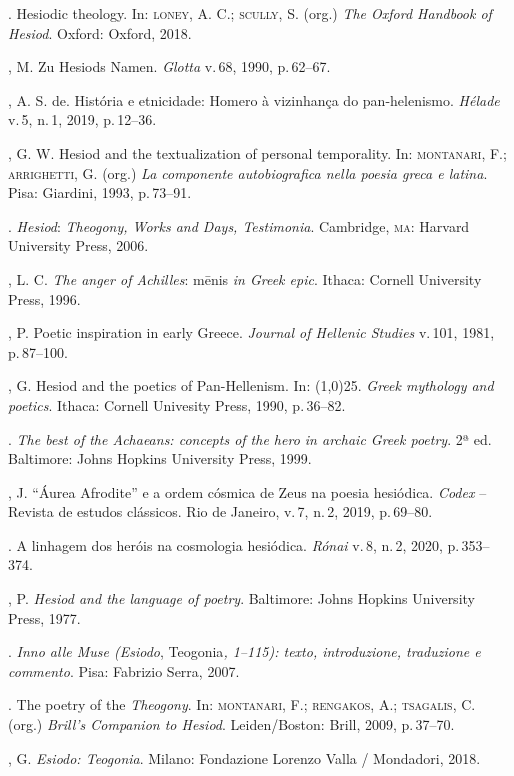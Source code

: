\begin{bibliohedra}
\titidem. Hesiodic theology. In: \textsc{loney}, A. C.; \textsc{scully}, S. (org.) \textit{The
Oxford Handbook of Hesiod}. Oxford: Oxford, 2018.

, M. Zu Hesiods Namen. \textit{Glotta} v.\,68, 1990, p.\,62--67.

, A. S. de. História e etnicidade: Homero à vizinhança do
pan-helenismo. \textit{Hélade} v.\,5, n.\,1, 2019, p.\,12--36.

, G. W. Hesiod and the textualization of personal temporality. In:
\textsc{montanari}, F.; \textsc{arrighetti}, G. (org.) \textit{La componente autobiografica
nella poesia greca e latina}. Pisa: Giardini, 1993, p.\,73--91.

\titidem. \textit{Hesiod}: \textit{Theogony, Works and Days, Testimonia}.
Cambridge, \textsc{ma}: Harvard University Press, 2006.

, L. C. \textit{The anger of Achilles}: mēnis \textit{in Greek
epic}. Ithaca: Cornell University Press, 1996.

, P. Poetic inspiration in early Greece. \textit{Journal of Hellenic
Studies} v.\,101, 1981, p.\,87--100.

, G. Hesiod and the poetics of Pan-Hellenism. In: \line(1,0){25}. \textit{Greek
mythology and poetics}. Ithaca: Cornell Univesity Press, 1990, p.\,36--82.

\titidem. \textit{The best of the Achaeans: concepts of the hero in archaic Greek
poetry}. 2ª ed. Baltimore: Johns Hopkins University Press, 1999.

, J. ``Áurea Afrodite'' e a ordem cósmica de Zeus na poesia
hesiódica. \textit{Codex} -- Revista de estudos clássicos. Rio de Janeiro,
v.\,7, n.\,2, 2019, p.\,69--80.

\titidem. A linhagem dos heróis na cosmologia hesiódica. \textit{Rónai} v.\,8, n.\,2, 2020, p.\,353--374.

, P. \textit{Hesiod and the language of poetry}. Baltimore: Johns
Hopkins University Press, 1977.

\titidem. \textit{Inno alle Muse (Esiodo}, Teogonia\textit{, 1--115): texto,
introduzione, traduzione e commento}. Pisa: Fabrizio Serra, 2007.

\titidem. The poetry of the \textit{Theogony}. In: \textsc{montanari}, F.; \textsc{rengakos}, A.;
\textsc{tsagalis}, C. (org.) \textit{Brill's Companion to Hesiod}. Leiden/Boston:
Brill, 2009, p.\,37--70.

, G. \textit{Esiodo: Teogonia}. Milano: Fondazione Lorenzo
Valla / Mondadori, 2018.


\end{bibliohedra}
